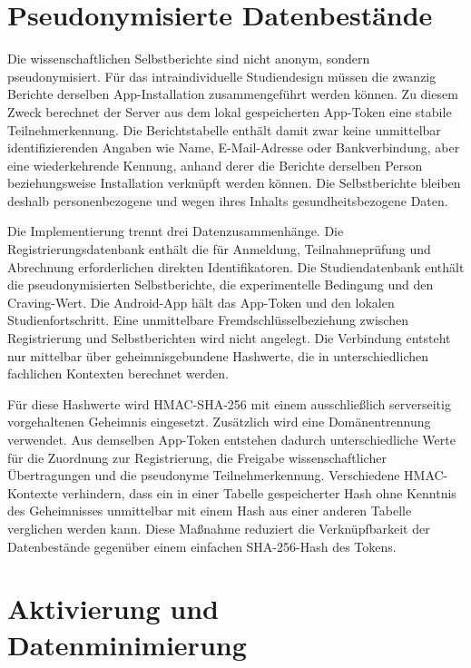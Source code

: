 
\section{Pseudonymisierte Datenbestände}

Die wissenschaftlichen Selbstberichte sind nicht anonym, sondern pseudonymisiert. Für das intraindividuelle Studiendesign müssen die zwanzig Berichte derselben App-Installation zusammengeführt werden können. Zu diesem Zweck berechnet der Server aus dem lokal gespeicherten App-Token eine stabile Teilnehmerkennung. Die Berichtstabelle enthält damit zwar keine unmittelbar identifizierenden Angaben wie Name, E-Mail-Adresse oder Bankverbindung, aber eine wiederkehrende Kennung, anhand derer die Berichte derselben Person beziehungsweise Installation verknüpft werden können. Die Selbstberichte bleiben deshalb personenbezogene und wegen ihres Inhalts gesundheitsbezogene Daten.

Die Implementierung trennt drei Datenzusammenhänge. Die Registrierungsdatenbank enthält die für Anmeldung, Teilnahmeprüfung und Abrechnung erforderlichen direkten Identifikatoren. Die Studiendatenbank enthält die pseudonymisierten Selbstberichte, die experimentelle Bedingung und den Craving-Wert. Die Android-App hält das App-Token und den lokalen Studienfortschritt. Eine unmittelbare Fremdschlüsselbeziehung zwischen Registrierung und Selbstberichten wird nicht angelegt. Die Verbindung entsteht nur mittelbar über geheimnisgebundene Hashwerte, die in unterschiedlichen fachlichen Kontexten berechnet werden.

Für diese Hashwerte wird HMAC-SHA-256 mit einem ausschließlich serverseitig vorgehaltenen Geheimnis eingesetzt. Zusätzlich wird eine Domänentrennung verwendet. Aus demselben App-Token entstehen dadurch unterschiedliche Werte für die Zuordnung zur Registrierung, die Freigabe wissenschaftlicher Übertragungen und die pseudonyme Teilnehmerkennung. Verschiedene HMAC-Kontexte verhindern, dass ein in einer Tabelle gespeicherter Hash ohne Kenntnis des Geheimnisses unmittelbar mit einem Hash aus einer anderen Tabelle verglichen werden kann. Diese Maßnahme reduziert die Verknüpfbarkeit der Datenbestände gegenüber einem einfachen SHA-256-Hash des Tokens.

\section{Aktivierung und Datenminimierung}

